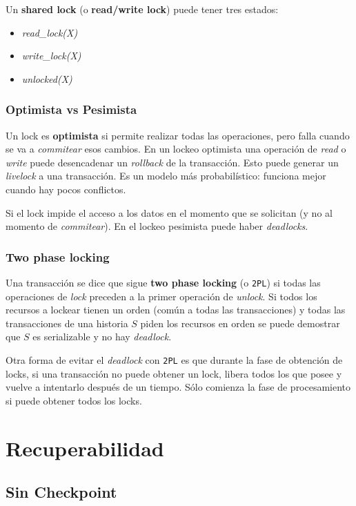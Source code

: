 \documentclass[]{article}
\begin{document}
Un \textbf{shared lock} (o \textbf{read/write lock}) puede tener tres estados:
\begin{itemize}
    \item \emph{read\_lock(X)}
    \item \emph{write\_lock(X)}
    \item \emph{unlocked(X)}
\end{itemize}

\subsubsection{Optimista vs Pesimista}
Un lock es \textbf{optimista} si permite realizar todas las operaciones, pero falla cuando se va a \emph{commitear} esos cambios. En un lockeo optimista una operación de \emph{read} o \emph{write} puede desencadenar un \emph{rollback} de la transacción. Esto puede generar un \emph{livelock} a una transacción. Es un modelo más probabilístico: funciona mejor cuando hay pocos conflictos.

Si el lock impide el acceso a los datos en el momento que se solicitan (y no al momento de \emph{commitear}). En el lockeo pesimista puede haber \emph{deadlocks}.

\subsubsection{Two phase locking}
Una transacción se dice que sigue \textbf{two phase locking} (o \texttt{2PL}) si todas las operaciones de \emph{lock} preceden a la primer operación de \emph{unlock}. Si todos los recursos a lockear tienen un orden (común a todas las transacciones) y todas las transacciones de una historia $S$ piden los recursos en orden se puede demostrar que $S$ es serializable y no hay \emph{deadlock}.

Otra forma de evitar el \emph{deadlock} con \texttt{2PL} es que durante la fase de obtención de locks, si una transacción no puede obtener un lock, libera todos los que posee y vuelve a intentarlo después de un tiempo. Sólo comienza la fase de procesamiento si puede obtener todos los locks.





\section{Recuperabilidad}
\subsection{Sin Checkpoint}
\end{document}
